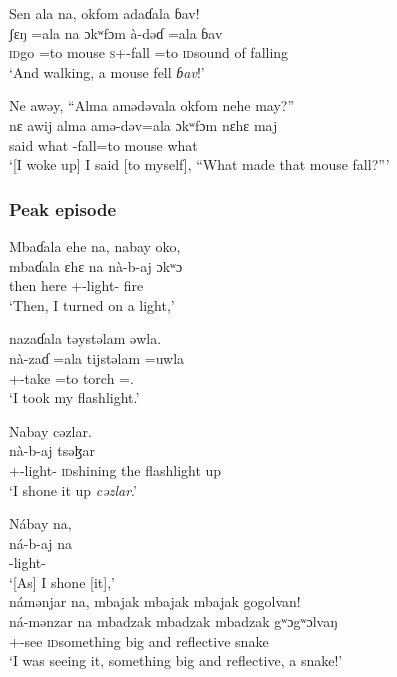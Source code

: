 \ea 
 Sen  ala  na,  okfom  adaɗala   ɓav!\\
\gll ʃɛŋ    =ala     na ɔkʷfɔm   à-dəɗ        =ala   ɓav\\
\textsc{id}go   =to      {\PSP}   mouse  \textsc{s}+{\PFV}-fall  =to     {\textsc{id}sound of falling} \\
\glt ‘And walking, a mouse fell \textit{ɓav}!’
\z

\ea
 Ne awəy,  “Alma  {amədəvala}  okfom  nehe  may?”\\
\gll nɛ awij    alma   amə-dəv=ala ɔkʷfɔm   nɛhɛ    maj\\
{\oneS} said     what   {\DEP}-fall=to     mouse    {\DEM}  what \\
\glt ‘[I woke up]  I said [to myself], “What made that mouse fall?”’
\z

\subsubsection*{Peak episode}
\ea 
 Mbaɗala  ehe  na, nabay  oko,\\
\gll mbaɗala   ɛhɛ   na nà-b-aj  ɔkʷɔ\\
 then       here   {\PSP}  {\oneS}+{\PFV}-light{}-{\CL}      fire\\
\glt ‘Then, I turned on a light,’
\z

\ea 
 nazaɗala  təystəlam  əwla.\\
\gll nà-zaɗ =ala tijstəlam =uwla\\
{\oneS}+{\PFV}-take  =to     torch   ={\oneS}.{\POSS}\\
\glt ‘I took my flashlight.’
\z 

\ea 
Nabay  cəzlar.\\
\gll nà-b-aj tsəɮar\\
{\oneS}+{\PFV}-light{}-{\CL}       {\textsc{id}shining the flashlight up}\\
\glt ‘I shone it up \textit{cəzlar}.’
\z

\ea   Nábay  na,\\
\gll ná-b-aj     na\\ 
{\oneS}-light{}-{\CL}  {\PSP}\\
\glt ‘[As] I shone [it],’\\

\medskip
 námənjar  na,  {mbajak  mbajak  mbajak}  gogolvan!\\
\gll ná-mənzar     na     {mbadzak   mbadzak    mbadzak}  gʷɔgʷɔlvaŋ\\
{\oneS}+{\IFV}-see  {\PSP}    {\textsc{id}something big and reflective}   snake\\
\glt ‘I was seeing it, something big and reflective, a snake!’
\z


